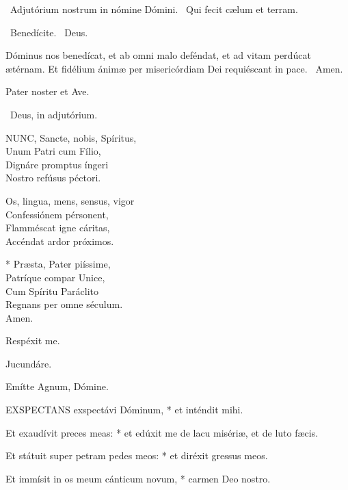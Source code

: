 \sectionornament

\V\ Adjutórium nostrum in nómine Dómini. \R\ Qui fecit cælum et terram.

\V\ Benedícite. \R\ Deus.

 Dóminus nos benedícat, et ab omni malo deféndat, et ad vitam perdúcat ætérnam. Et fidélium ánimæ per misericórdiam Dei requiéscant in pace. \R\ Amen.


\sectionornament


Pater noster et Ave.

\V\ Deus, in adjutórium.


\lettrine[lines=2]{N}{UNC}, Sancte, nobis, Spíritus,\\
Unum Patri cum Fílio,\\
Dignáre promptus íngeri\\
Nostro refúsus péctori.

Os, lingua, mens, sensus, vigor\\
Confessiónem pérsonent,\\
Flamméscat igne cáritas,\\
Accéndat ardor próximos.

* Præsta, Pater piíssime,\\
Patríque compar Unice,\\
Cum Spíritu Paráclito\\
Regnans per omne séculum.\\
Amen.

  Respéxit me.


  Jucundáre.

  Emítte Agnum, Dómine.


\lettrine[lines=2]{E}{XSPECTANS} exspectávi Dóminum, * et inténdit mihi.

Et exaudívit preces meas: * et edúxit me de lacu misériæ, et de luto fæcis.

Et státuit super petram pedes meos: * et diréxit gressus meos.

Et immísit in os meum cánticum novum, * carmen Deo nostro.


